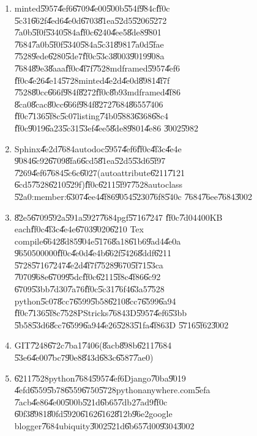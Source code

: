 \begin{enumerate}
\item minted\U{5957}\U{4ef6}\U{6709}\U{4e00}\U{500b}\U{554f}\U{984c}\U{ff0c}%
\U{5c31}\U{662f}\U{4ed6}\U{4e0d}\U{6703}\U{81ea}\U{52d5}\U{5206}\U{5272}%
\U{7a0b}\U{5f0f}\U{5340}\U{584a}\U{ff0c}\U{6240}\U{4ee5}\U{8de8}\U{9801}%
\U{7684}\U{7a0b}\U{5f0f}\U{5340}\U{584a}\U{5c31}\U{8981}\U{7a0d}\U{5fae}%
\U{7528}\U{9ede}\U{6280}\U{5de7}\U{ff0c}\U{53c3}\U{8003}\U{9019}\U{908a}%
\U{7684}\U{89e3}\U{8aaa}\U{ff0c}\U{4f7f}\U{7528}mdframed\U{5957}\U{4ef6}%
\U{ff0c}\U{4e26}\U{4e14}\U{5728}minted\U{4e2d}\U{4e0d}\U{8981}\U{4f7f}%
\U{7528}\U{80cc}\U{666f}\U{984f}\U{8272}\U{ff0c}\U{8b93}mdframed\U{4f86}%
\U{8ca0}\U{8cac}\U{80cc}\U{666f}\U{984f}\U{8272}\U{7684}\U{8655}\U{7406}%
\U{ff0c}\U{7136}\U{5f8c}\U{5c07}listing\U{74b0}\U{5883}\U{6368}\U{68c4}%
\U{ff0c}\U{9019}\U{6a23}\U{5c31}\U{53ef}\U{4ee5}\U{8de8}\U{9801}\U{4e86}%
\U{3002}\U{5982}

\item Sphinx\U{4e2d}\U{7684}autodoc\U{5957}\U{4ef6}\U{ff0c}\U{4f3c}\U{4e4e}%
\U{9084}\U{6c92}\U{6709}\U{8fa6}\U{6cd5}\U{81ea}\U{52d5}\U{53d6}\U{5f97}%
\U{7269}\U{4ef6}\U{7684}\U{5c6c}\U{6027}(autoattribute\U{6211}\U{7121}%
\U{6cd5}\U{7528}\U{6210}\U{529f})\U{ff0c}\U{6211}\U{5f97}\U{7528}autoclass%
\U{52a0}:member:\U{6307}\U{4ee4}\U{4f86}\U{9054}\U{5230}\U{76f8}\U{540c}%
\U{7684}\U{76ee}\U{7684}\U{3002}

\item \U{82e5}\U{6709}\U{592a}\U{591a}\U{5927}\U{7684}pgf\U{5716}\U{7247}%
\U{ff0c}\U{7d04}400KB each\U{ff0c}\U{4f3c}\U{4e4e}\U{6703}\U{9020}\U{6210}%
Tex compile\U{6642}\U{8d85}\U{904e}\U{5176}\U{8a18}\U{61b6}\U{9ad4}\U{4e0a}%
\U{9650}500000\U{ff0c}\U{4e0d}\U{4e4b}\U{662f}\U{5426}\U{8ddf}\U{6211}%
\U{5728}\U{5716}\U{7247}\U{4e2d}\U{4f7f}\U{7528}\U{9670}\U{5f71}\U{53ca}%
\U{7070}\U{968e}\U{6709}\U{95dc}\U{ff0c}\U{6211}\U{5f8c}\U{4f86}\U{6c92}%
\U{6709}\U{53bb}\U{7d30}\U{7a76}\U{ff0c}\U{5c31}\U{76f4}\U{63a5}\U{7528}%
python\U{5c07}\U{8cc7}\U{6599}\U{5b58}\U{6210}\U{8cc7}\U{6599}\U{6a94}%
\U{ff0c}\U{7136}\U{5f8c}\U{7528}PStricks\U{7684}3D\U{5957}\U{4ef6}\U{53bb}%
\U{5b58}\U{53d6}\U{8cc7}\U{6599}\U{6a94}\U{4e26}\U{5283}\U{51fa}\U{4f86}3D%
\U{5716}\U{5f62}\U{3002}

\item GIT\U{7248}\U{672c}\U{7ba1}\U{7406}(\U{8acb}\U{898b}\U{6211}\U{7684}%
\U{53e6}\U{4e00}\U{7bc7}\U{90e8}\U{843d}\U{683c}\U{6587}\U{7ae0})

\item \U{6211}\U{7528}python\U{7684}\U{5957}\U{4ef6}Django\U{70ba}\U{9019}%
\U{4efd}\U{6559}\U{5b78}\U{6559}\U{6750}\U{5728}pythonanywhere.com\U{5efa}%
\U{7acb}\U{4e86}\U{4e00}\U{500b}\U{521d}\U{6b65}\U{7db2}\U{7ad9}\U{ff0c}%
\U{60f3}\U{8981}\U{80fd}\U{5920}\U{6162}\U{6162}\U{812b}\U{96e2}google
blogger\U{7684}ubiquity\U{3002}\U{521d}\U{6b65}\U{7d00}\U{9304}\U{3002}
\end{enumerate}

